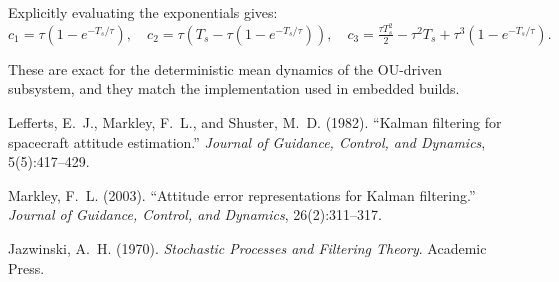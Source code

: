 \documentclass[11pt]{article}
\begin{document}
Explicitly evaluating the exponentials gives:
\[
c_1=\tau(1-e^{-T_s/\tau}),\quad
c_2=\tau\!\left(T_s-\tau(1-e^{-T_s/\tau})\right),\quad
c_3=\tfrac{\tau T_s^2}{2}-\tau^2 T_s+\tau^3(1-e^{-T_s/\tau}).
\]

These are exact for the deterministic mean dynamics of the OU-driven subsystem, and they match the implementation used in embedded builds.

\begin{thebibliography}{9}
Lefferts, E.~J., Markley, F.~L., and Shuster, M.~D. (1982). 
``Kalman filtering for spacecraft attitude estimation.'' 
\emph{Journal of Guidance, Control, and Dynamics}, 5(5):417--429.

Markley, F.~L. (2003). 
``Attitude error representations for Kalman filtering.'' 
\emph{Journal of Guidance, Control, and Dynamics}, 26(2):311--317.

Jazwinski, A.~H. (1970). 
\emph{Stochastic Processes and Filtering Theory}. 
Academic Press.
\end{thebibliography}
\end{document}
